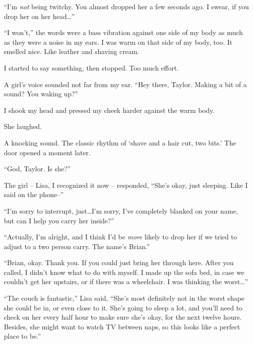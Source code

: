 ``I'm \emph{not} being twitchy.  You almost dropped her a few seconds ago.  I swear, if you drop her on her head\ldots''



``I won't,'' the words were a bass vibration against one side of my body as much as they were a noise in my ears.  I was warm on that side of my body, too.  It smelled nice.  Like leather and shaving cream.



I started to say something, then stopped.  Too much effort.



A girl's voice sounded not far from my ear.  ``Hey there, Taylor.  Making a bit of a sound?  You waking up?''



I shook my head and pressed my cheek harder against the warm body.



She laughed.



A knocking sound.  The classic rhythm of `shave and a hair cut, two bits.'  The door opened a moment later.



``God, Taylor.  Is she?''



The girl – Lisa, I recognized it now – responded, ``She's okay, just sleeping.  Like I said on the phone--''



``I'm sorry to interrupt, just\ldots I'm sorry, I've completely blanked on your name, but can I help you carry her inside?''



``Actually, I'm alright, and I think I'd be \emph{more} likely to drop her if we tried to adjust to a two person carry.  The name's Brian.''



``Brian, okay.  Thank you.  If you could just bring her through here.  After you called, I didn't know what to do with myself.  I made up the sofa bed, in case we couldn't get her upstairs, or if there was a wheelchair.  I was thinking the worst\ldots''



``The couch is fantastic,'' Lisa said, ``She's most definitely not in the worst shape she could be in, or even close to it.  She's going to sleep a lot, and you'll need to check on her every half hour to make sure she's okay, for the next twelve hours.  Besides, she might want to watch TV between naps, so this looks like a perfect place to be.''



